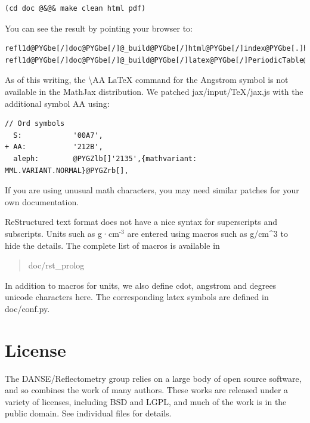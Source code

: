 \documentclass[letterpaper,10pt,english]{sphinxmanual}
\begin{document}
\begin{Verbatim}[commandchars=@\[\]]
(cd doc @&@& make clean html pdf)
\end{Verbatim}

You can see the result by pointing your browser to:

\begin{Verbatim}[commandchars=@\[\]]
refl1d@PYGbe[/]doc@PYGbe[/]@_build@PYGbe[/]html@PYGbe[/]index@PYGbe[.]html
refl1d@PYGbe[/]doc@PYGbe[/]@_build@PYGbe[/]latex@PYGbe[/]PeriodicTable@PYGbe[.]pdf
\end{Verbatim}

As of this writing, the \textbackslash{}AA LaTeX command for the Angstrom symbol is not
available in the MathJax distribution. We patched jax/input/TeX/jax.js
with the additional symbol AA using:

\begin{Verbatim}[commandchars=@\[\]]
  // Ord symbols
  S:            '00A7',
+ AA:           '212B',
  aleph:        @PYGZlb[]'2135',{mathvariant: MML.VARIANT.NORMAL}@PYGZrb[],
\end{Verbatim}

If you are using unusual math characters, you may need similar patches
for your own documentation.

ReStructured text format does not have a nice syntax for superscripts and
subscripts.  Units such as g·cm$^{\text{-3}}$ are entered using macros such as
\textbar{}g/cm\textasciicircum{}3\textbar{} to hide the details.  The complete list of macros is available in
\begin{quote}

doc/rst\_prolog
\end{quote}

In addition to macros for units, we also define cdot, angstrom and degrees
unicode characters here.  The corresponding latex symbols are defined in
doc/conf.py.


\section{License}
\label{getting_started/license::doc}\label{getting_started/license:license}\label{getting_started/license:id1}
The DANSE/Reflectometry group relies on a large body of open source
software, and so combines the work of many authors. These works are
released under a variety of licenses, including BSD and LGPL, and much
of the work is in the public domain. See individual files for details.
\end{document}
